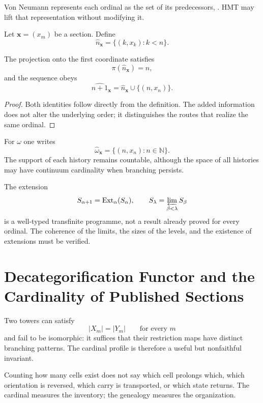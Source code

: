 Von Neumann represents each ordinal as the set of its predecessors,
\citep{vonneumann1923}. HMT may lift that representation without modifying it.

\begin{definition}
Let \(\boldsymbol x=(x_m)\) be a section. Define
\[
  \widehat n_{\boldsymbol x}
  =
  \{(k,x_k):k<n\}.
\]
\end{definition}

\begin{proposition}
The projection onto the first coordinate satisfies
\[
  \pi(\widehat n_{\boldsymbol x})=n,
\]
and the sequence obeys
\[
  \widehat{n+1}_{\boldsymbol x}
  =
  \widehat n_{\boldsymbol x}\cup\{(n,x_n)\}.
\]
\end{proposition}

\begin{proof}
Both identities follow directly from the definition. The added information
does not alter the underlying order; it distinguishes the routes that
realize the same ordinal.
\end{proof}

For \(\omega\) one writes
\[
  \widehat\omega_{\boldsymbol x}
  =
  \{(n,x_n):n\in\mathbb N\}.
\]
The support of each history remains countable, although the space of
all histories may have continuum cardinality when branching
persists.

\begin{remark}
The extension
\[
S_{\alpha+1}=\operatorname{Ext}_\alpha(S_\alpha),
\qquad
S_\lambda=\varprojlim_{\beta<\lambda}S_\beta
\]
is a well-typed transfinite programme, not a result already proved for
every ordinal. The coherence of the limits, the sizes of the
levels, and the existence of extensions must be verified.
\end{remark}

\section{Decategorification Functor and the Cardinality of Published Sections}

Two towers can satisfy
\[
  |X_m|=|Y_m|\qquad\text{for every }m
\]
and fail to be isomorphic: it suffices that their restriction maps have distinct
branching patterns. The cardinal profile is therefore a useful
but nonfaithful invariant.

\begin{remark}
Counting how many cells exist does not say which cell prolongs which, which
orientation is reversed, which carry is transported, or which state returns. The
cardinal measures the inventory; the genealogy measures the organization.
\end{remark}


